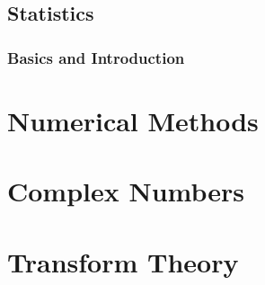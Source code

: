 \documentclass[8pt]{report}
\begin{document}
	\section{Statistics}
		\subsection{Basics and Introduction}
\chapter{Numerical Methods}
\chapter{Complex Numbers}
\chapter{Transform Theory}
\end{document}

